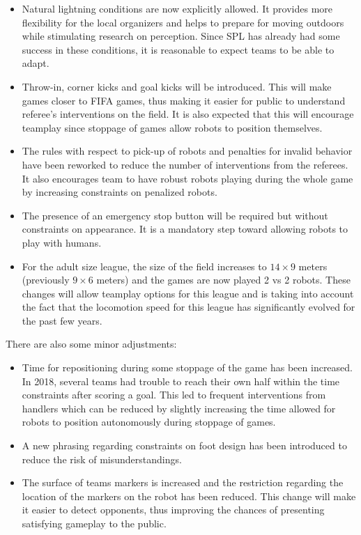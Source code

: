 \documentclass{article}
\begin{document}
\begin{itemize}
\item Natural lightning conditions are now explicitly allowed.
  It provides more flexibility for the local organizers and
  helps to prepare for moving outdoors while stimulating research on perception.
  Since SPL has already had some success in these conditions,
  it is reasonable to expect teams to be able to adapt.
\item Throw-in, corner kicks and goal kicks will be introduced.
  This will make games closer to FIFA games,
  thus making it easier for public to understand referee's interventions on the field.
  It is also expected that this will encourage teamplay since stoppage of games
  allow robots to position themselves.
\item The rules with respect to pick-up of robots and penalties for invalid
  behavior have been reworked to reduce the number of interventions from the referees.
  It also encourages team to have robust robots playing during the whole game by
  increasing constraints on penalized robots.
\item The presence of an emergency stop button will be required but without
  constraints on appearance.
  It is a mandatory step toward allowing robots to play with humans.
\item For the adult size league, the size of the field increases to
  $14 \times 9$ meters (previously $9 \times 6$ meters)
  and the games are now played 2 vs 2 robots.
  These changes will allow teamplay options for this league and is taking into
  account the fact that the locomotion speed for this league has significantly
  evolved for the past few years.
\end{itemize}

There are also some minor adjustments:

\begin{itemize}
\item Time for repositioning during some stoppage of the game has been increased.
  In 2018, several teams had trouble to reach their own half within the time
  constraints after scoring a goal.
  This led to frequent interventions from handlers which can be reduced by
  slightly increasing the time allowed for robots to position autonomously
  during stoppage of games.
\item A new phrasing regarding constraints on foot design has been introduced to
  reduce the risk of misunderstandings.
\item The surface of teams markers is increased and the restriction regarding the 
  location of the markers on the robot has been reduced.
  This change will make it easier to detect opponents,
  thus improving the chances of presenting satisfying gameplay to the public.
\end{itemize}
\end{document}
